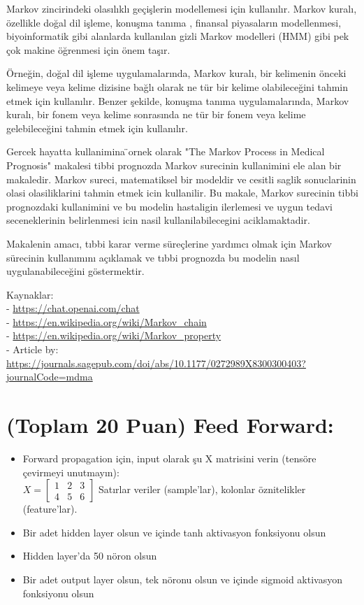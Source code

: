 \documentclass[11pt]{article}
\begin{document}
 Markov zincirindeki olasılıklı geçişlerin modellemesi için kullanılır. Markov kuralı, özellikle doğal dil işleme, konuşma tanıma , finansal piyasaların modellenmesi, biyoinformatik gibi alanlarda kullanılan gizli Markov modelleri (HMM) gibi pek çok makine öğrenmesi için önem taşır.

 Örneğin, doğal dil işleme uygulamalarında, Markov kuralı, bir kelimenin önceki kelimeye veya kelime dizisine bağlı olarak ne tür bir kelime olabileceğini tahmin etmek için kullanılır. Benzer şekilde, konuşma tanıma uygulamalarında, Markov kuralı, bir fonem veya kelime sonrasında ne tür bir fonem veya kelime gelebileceğini tahmin etmek için kullanılır.
 
 Gercek hayatta kullanimina ̈ornek olarak "The Markov Process in Medical Prognosis" makalesi tibbi prognozda Markov surecinin kullanimini ele alan bir makaledir. Markov sureci, matematiksel bir modeldir ve cesitli saglik sonuclarinin olasi olasiliklarini tahmin etmek icin kullanilir. Bu makale, Markov surecinin tibbi prognozdaki kullanimini ve bu modelin hastaligin ilerlemesi ve uygun tedavi seceneklerinin belirlenmesi icin nasil kullanilabilecegini aciklamaktadir.

 Makalenin amacı, tıbbi karar verme süreçlerine yardımcı olmak için Markov sürecinin kullanımını açıklamak ve tıbbi prognozda bu modelin nasıl uygulanabileceğini göstermektir.

 Kaynaklar:
\\ - \url{https://chat.openai.com/chat}
\\ - \url{https://en.wikipedia.org/wiki/Markov_chain}
\\ - \url{https://en.wikipedia.org/wiki/Markov_property}
\\ - Article by: \url{https://journals.sagepub.com/doi/abs/10.1177/0272989X8300300403?journalCode=mdma}
 
\section{(Toplam 20 Puan) Feed Forward:}
 
\begin{itemize}
    \item Forward propagation için, input olarak şu X matrisini verin (tensöre çevirmeyi unutmayın):\\
    $X = \begin{bmatrix}
        1 & 2 & 3\\
        4 & 5 & 6
        \end{bmatrix}$
    Satırlar veriler (sample'lar), kolonlar öznitelikler (feature'lar).
    \item Bir adet hidden layer olsun ve içinde tanh aktivasyon fonksiyonu olsun
    \item Hidden layer'da 50 nöron olsun
    \item Bir adet output layer olsun, tek nöronu olsun ve içinde sigmoid aktivasyon fonksiyonu olsun
\end{itemize}
\end{document}

